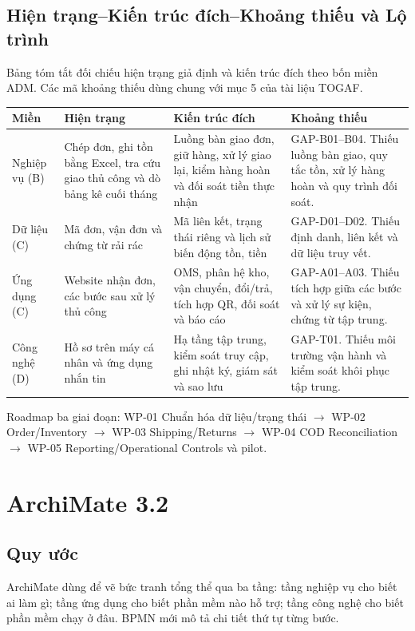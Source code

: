 \documentclass[12pt,a4paper]{report}
\begin{document}
\section{Hiện trạng--Kiến trúc đích--Khoảng thiếu và Lộ trình}
Bảng tóm tắt đối chiếu hiện trạng giả định và kiến trúc đích theo bốn miền ADM. Các mã khoảng thiếu dùng chung với mục 5 của tài liệu TOGAF.
\begin{longtable}{p{}p{}p{}p{}}
\toprule
\textbf{Miền} & \textbf{Hiện trạng} & \textbf{Kiến trúc đích} & \textbf{Khoảng thiếu}\\
\midrule\endhead
Nghiệp vụ (B) & Chép đơn, ghi tồn bằng Excel, tra cứu giao thủ công và dò bảng kê cuối tháng & Luồng bàn giao đơn, giữ hàng, xử lý giao lại, kiểm hàng hoàn và đối soát tiền thực nhận & GAP-B01--B04. Thiếu luồng bàn giao, quy tắc tồn, xử lý hàng hoàn và quy trình đối soát.\\
Dữ liệu (C) & Mã đơn, vận đơn và chứng từ rải rác & Mã liên kết, trạng thái riêng và lịch sử biến động tồn, tiền & GAP-D01--D02. Thiếu định danh, liên kết và dữ liệu truy vết.\\
Ứng dụng (C) & Website nhận đơn, các bước sau xử lý thủ công & OMS, phân hệ kho, vận chuyển, đổi/trả, tích hợp QR, đối soát và báo cáo & GAP-A01--A03. Thiếu tích hợp giữa các bước và xử lý sự kiện, chứng từ tập trung.\\
Công nghệ (D) & Hồ sơ trên máy cá nhân và ứng dụng nhắn tin & Hạ tầng tập trung, kiểm soát truy cập, ghi nhật ký, giám sát và sao lưu & GAP-T01. Thiếu môi trường vận hành và kiểm soát khôi phục tập trung.\\
\bottomrule
\end{longtable}

Roadmap ba giai đoạn: WP-01 Chuẩn hóa dữ liệu/trạng thái $\rightarrow$ WP-02 Order/Inventory $\rightarrow$ WP-03 Shipping/Returns $\rightarrow$ WP-04 COD Reconciliation $\rightarrow$ WP-05 Reporting/Operational Controls và pilot.

\chapter{ArchiMate 3.2}

\section{Quy ước}
ArchiMate dùng để vẽ bức tranh tổng thể qua ba tầng: tầng nghiệp vụ cho biết ai làm gì; tầng ứng dụng cho biết phần mềm nào hỗ trợ; tầng công nghệ cho biết phần mềm chạy ở đâu. BPMN mới mô tả chi tiết thứ tự từng bước.
\end{document}
